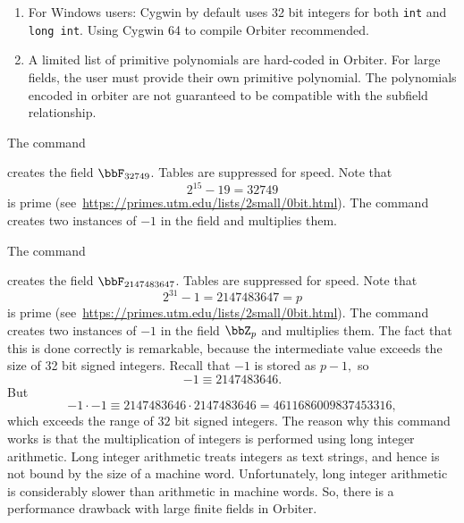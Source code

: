 \begin{enumerate}
\item
For Windows users: Cygwin by default uses 32 bit integers for both \verb'int' and \verb'long int'. 
Using Cygwin 64 to compile Orbiter recommended.
\item
A limited list of primitive polynomials are hard-coded in Orbiter. 
For large fields, the user must provide their own primitive polynomial.
The polynomials encoded in orbiter are not guaranteed to be compatible with the subfield relationship.
\end{enumerate}


\bigskip


The command  


creates the field $\bbF_{32749}$. Tables are suppressed for speed.
Note that 
$$
2^{15}-19 = 32749
$$
is prime (see~\url{https://primes.utm.edu/lists/2small/0bit.html}).
The command creates two instances of $-1$ in the field and multiplies them. 


\bigskip


The command  


creates the field $\bbF_{2147483647}$. Tables are suppressed for speed.
Note that 
$$
2^{31}-1 = 2147483647 = p
$$
is prime (see~\url{https://primes.utm.edu/lists/2small/0bit.html}).
The command creates two instances of $-1$ in the field $\bbZ_p$ 
and multiplies them. 
The fact that this is done correctly is remarkable, because 
the intermediate value exceeds the size of 32 bit signed integers.
Recall that 
$-1$ is stored as $p-1,$ 
so
$$
-1 \equiv 2147483646.
$$
But
$$
-1 \cdot -1 \equiv 2147483646 \cdot 2147483646 = 4611686009837453316,
$$
which exceeds the range of $32$ bit signed integers.
The reason why this command works is that the multiplication of integers 
is performed using long integer arithmetic.
Long integer arithmetic treats integers as text strings, and hence is not bound 
by the size of a machine word. Unfortunately, 
long integer arithmetic is considerably slower than arithmetic in machine words.
So, there is a performance drawback with large finite fields in Orbiter.


